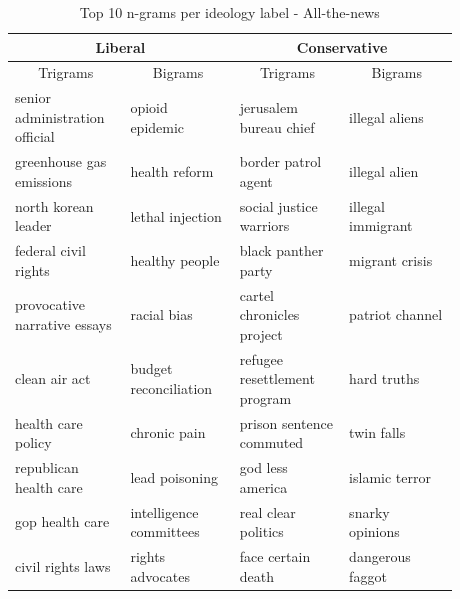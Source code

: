 \documentclass[10pt,a4paper,onecolumn]{article}
\begin{document}
\begin{table}[h!]
	\begin{center}
		\caption{Top 10 n-grams per ideology label - All-the-news}
		\label{tab:ngrams-atn}
		\begin{tabular}{p{0.22\linewidth}|p{0.22\linewidth}|p{0.22\linewidth}|p{0.22\linewidth}}
			\hline\hline
			\multicolumn{2}{c|}{\textbf{Liberal}} & \multicolumn{2}{c|}{\textbf{Conservative}} \\
			\hline
			\multicolumn{1}{c|}{Trigrams} & \multicolumn{1}{c|}{Bigrams} & \multicolumn{1}{c|}{Trigrams} & \multicolumn{1}{c|}{Bigrams} \\
			\hline
			senior administration official & opioid epidemic & jerusalem bureau chief & illegal aliens \\
			greenhouse gas emissions & health reform & border patrol agent & illegal alien \\
			north korean leader & lethal injection & social justice warriors & illegal immigrant \\
			federal civil rights & healthy people & black panther party & migrant crisis \\
			provocative narrative essays & racial bias & cartel chronicles project & patriot channel \\
			clean air act & budget reconciliation & refugee resettlement program & hard truths \\
			health care policy & chronic pain & prison sentence commuted & twin falls \\
			republican health care & lead poisoning & god less america & islamic terror \\
			gop health care & intelligence committees & real clear politics & snarky opinions \\
			civil rights laws & rights advocates & face certain death & dangerous faggot\footnotemark \\
			\hline\hline
		\end{tabular}
	\end{center}
\end{table}
\end{document}
